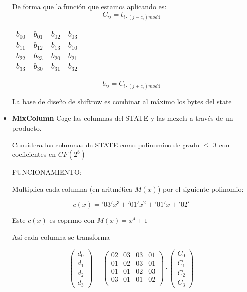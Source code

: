 \begin{itemize}
\begin{center}
\begin{tabular}{l | c | r | r | r}
			\end{tabular}
		\end{center}
		
		De forma que la función que estamos aplicando es:
		$$C_{ij} = b_{i\cdot (j-c_i) mod 4}$$
	
	
		\begin{center}
			
			\begin{tabular}{l | c | r | r}
				$b_{00}$ & $b_{01}$ & $b_{02}$ & $b_{03}$\\
				\hline
				$b_{11}$ &  $b_{12}$ & $b_{13}$  &  $b_{10}$ \\
				\hline
				$b_{22}$ &  $b_{23}$ & $b_{20}$  & $b_{21}$ \\
				\hline
				$b_{33}$ &  $b_{30}$ & $b_{31}$  & $b_{32}$
				
			\end{tabular}
		\end{center}
		
		
		$$b_{ij} = C_{i\cdot (j+c_i) mod 4}$$
		
		La base de diseño de shiftrow es combinar al máximo los bytes del state
		
		\item \textbf{MixColumn}
		Coge las columnas del STATE y las mezcla a través de un producto.
		
		Considera las columnas de STATE como polinomios de grado $\leq$ 3 con coeficientes en $GF(2^8)$
		
		FUNCIONAMIENTO:
		
		Multiplica cada columna (en aritmética $M(x)$) por el siguiente polinomio:
		
		$$c(x) = '03'x^3 + '01'x^2 + '01'x + '02'$$
		
		Este $c(x)$ es coprimo con $M(x) = x^4 +1$
		
		Así cada columna se transforma
		
		$$\left(\begin{matrix}
			d_0\\d_1\\d_2\\d_3
		\end{matrix} \right) = \left(\begin{matrix}
		02 & 03 & 03 & 01\\
		01 & 02 & 03 & 01\\
		01 & 01 & 02 & 03\\
		03 & 01 & 01 & 02\\
	\end{matrix}\right) \cdot \left( \begin{matrix}
	C_0\\
	C_1\\
	C_2\\
	C_3
\end{matrix}\right)$$
	

\end{itemize}
